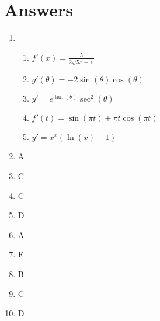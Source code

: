 \documentclass{article}
\begin{document}
\section{Answers}
\begin{enumerate}
\item \begin{enumerate}
        \item $f'(x) = \displaystyle \frac{5}{2 \sqrt{5x + 1}}$
        \item $g'(\theta) = -2 \sin (\theta) \cos (\theta)$
        \item $y' = e^{\tan (\theta)} \sec ^2 (\theta)$
        \item $f'(t) = \sin (\pi t) + \pi t \cos (\pi t)$
        \item $y' = x^x (\ln (x) + 1)$
    \end{enumerate}
\item A
\item C
\item C
\item D
\item A
\item E
\item B
\item C
\item D
\end{enumerate}
\end{document}

